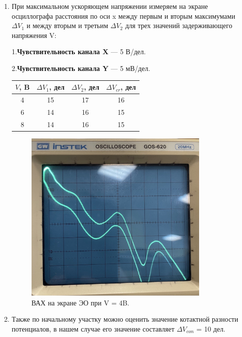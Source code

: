 \documentclass[a4paper,12pt]{article}
\begin{document}
 
 \begin{enumerate}
\item При максимальном ускоряющем напряжении измеряем на экране осциллографа расстояния по оси x между первым и вторым максимумами $\Delta{V_1}$ и между вторым и третьим $\Delta{V_2}$ для трех значений задерживающего напряжения V:
  
1.\textbf{Чувствительность канала X} — 5 В/дел.

2.\textbf{Чувствительность канала Y} — 5 мВ/дел.

  \begin{table}[H]
\begin{center}
\begin{tabular}{|c|c|c|c|}
\hline $V $, B&$\Delta{V_1}$, дел &$\Delta{V_2}$, дел& $\Delta{V_{cr}}$, дел\\
\hline 4&15&17&16\\
\hline 6&14&16&15\\
\hline 8&14&16&15\\
\hline 
\end{tabular}
\end{center}
\end{table}

    \begin{figure}[H]
  \begin{center}
    \includegraphics[width=9cm]{ex3.jpg}
    \caption{ВАХ на экране ЭО при V = 4B.}
    \label{fig:}
  \end{center}
\end{figure}

\item Также по начальному участку можно оценить значение котактной разности потенциалов, в нашем случае его значение составляет $\Delta{V_{con}}$ = 10 дел.


\end{enumerate}
\end{document}
